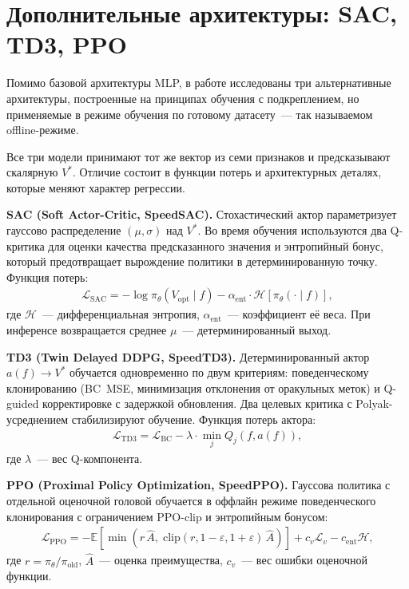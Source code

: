 \section{Дополнительные архитектуры: SAC, TD3, PPO}
\label{sec:rl_models}

Помимо базовой архитектуры MLP, в работе исследованы три альтернативные архитектуры, построенные на принципах обучения с подкреплением, но применяемые в режиме обучения по готовому датасету~--- так называемом offline-режиме.

Все три модели принимают тот же вектор из семи признаков и предсказывают скалярную $V^{\ast}$. Отличие состоит в функции потерь и архитектурных деталях, которые меняют характер регрессии.

\textbf{SAC (Soft Actor-Critic, SpeedSAC).} Стохастический актор параметризует гауссово распределение $(\mu, \sigma)$ над $V^{\ast}$. Во время обучения используются два Q-критика для оценки качества предсказанного значения и энтропийный бонус, который предотвращает вырождение политики в детерминированную точку. Функция потерь:
\begin{gather}
    \mathcal{L}_{\mathrm{SAC}} = -\log \pi_\theta(V_{\mathrm{opt}} \mid f)
    - \alpha_{\mathrm{ent}} \cdot \mathcal{H}[\pi_\theta(\cdot \mid f)],
\end{gather}
где $\mathcal{H}$~--- дифференциальная энтропия, $\alpha_{\mathrm{ent}}$~--- коэффициент её веса. При инференсе возвращается среднее $\mu$~--- детерминированный выход.

\textbf{TD3 (Twin Delayed DDPG, SpeedTD3).} Детерминированный актор $a(f) \to V^{\ast}$ обучается одновременно по двум критериям: поведенческому клонированию (BC~MSE, минимизация отклонения от оракульных меток) и Q-guided корректировке с задержкой обновления. Два целевых критика с Polyak-усреднением стабилизируют обучение. Функция потерь актора:
\begin{gather}
    \mathcal{L}_{\mathrm{TD3}} = \mathcal{L}_{\mathrm{BC}} - \lambda \cdot \min_j Q_j(f, a(f)),
\end{gather}
где $\lambda$~--- вес Q-компонента.

\textbf{PPO (Proximal Policy Optimization, SpeedPPO).} Гауссова политика с отдельной оценочной головой обучается в оффлайн режиме поведенческого клонирования с ограничением PPO-clip и энтропийным бонусом:
\begin{gather}
    \mathcal{L}_{\mathrm{PPO}} = -\mathbb{E}\left[\min\!\left(
        r\, \hat{A},\;
        \mathrm{clip}(r, 1{-}\varepsilon, 1{+}\varepsilon)\,\hat{A}
    \right)\right]
    + c_v \mathcal{L}_v - c_{\mathrm{ent}} \mathcal{H},
\end{gather}
где $r = \pi_\theta / \pi_{\mathrm{old}}$, $\hat{A}$~--- оценка преимущества, $c_v$~--- вес ошибки оценочной функции.

